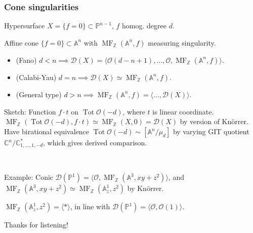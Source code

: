 \documentclass{beamer}
\DeclareMathOperator{\Tot}{Tot}
\DeclareMathOperator{\MF}{MF}
\newcommand{\A}{\mathbb{A}}
\newcommand{\C}{\mathbb{C}}
\newcommand{\Z}{\mathbb{Z}}
\renewcommand{\P}{\mathbb{P}}
\renewcommand{\O}{\mathcal{O}}
\newcommand{\calD}{\mathcal{D}}
\begin{document}
\begin{frame}
    \frametitle{Cone singularities}

    Hypersurface $X=\{f=0\}\subset\P^{n-1}$, $f$ homog. degree $d$. \pause

    Affine cone $\{f=0\}\subset\A^n$ with $\MF_\Z(\A^n,f)$ measuring
    singularity. \pause
    \begin{theorem}[Orlov]
        \begin{itemize}
            \item (Fano) $d<n\implies
                \calD(X)=\langle\O(d-n+1),\ldots,\O,\MF_\Z(\A^n,f)\rangle$.
            \item (Calabi-Yau) $d=n \implies
                \calD(X)\simeq\MF_\Z(\A^n,f)$.
            \item (General type) $d>n \implies
                \MF_\Z(\A^n,f)=\langle\ldots,\calD(X)\rangle$.
        \end{itemize}
    \end{theorem} \pause

    Sketch: Function $f\cdot t$ on $\Tot\O(-d)$, where $t$ is linear coordinate.
    \pause $\MF_\Z(\Tot\O(-d),f\cdot t)\simeq\MF_\Z(X,0)=\calD(X)$ by
    version of Kn\"orrer. \pause Have birational equivalence
    $\Tot\O(-d)\sim[\A^n/\mu_d]$ by varying GIT quotient
    $\C^n/\C^*_{1,\ldots,1,-d}$, which gives derived comparison. \pause


    ~

    Example: Conic $\calD(\P^1)=\langle\O,\MF_\Z(\A^3,xy+z^2)\rangle$, \pause
    and $\MF_\Z(\A^3,xy+z^2)\simeq\MF_\Z(\A^1_z,z^2)$ by Kn\"orrer. \pause

    $\MF_\Z(\A^1_z,z^2)=\langle*\rangle$, in line with
    $\calD(\P^1)=\langle\O,\O(1)\rangle$.
\end{frame}

\begin{frame}
    Thanks for listening!
\end{frame}
\end{document}
